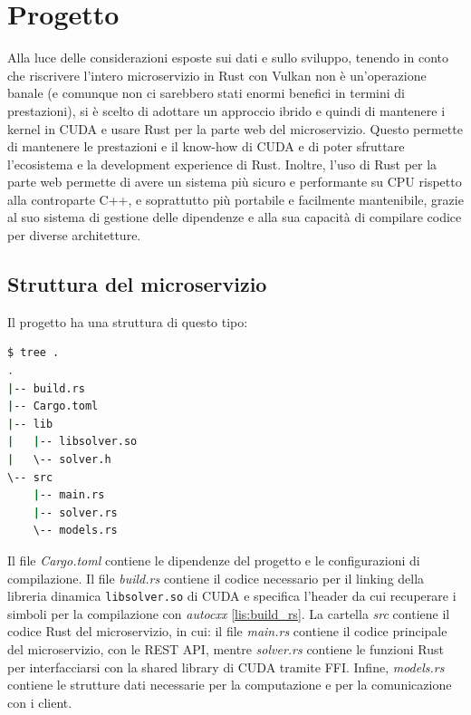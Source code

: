 \chapter{Progetto}
\label{sec:arch}

Alla luce delle considerazioni esposte sui dati e sullo sviluppo, tenendo in conto che riscrivere l'intero microservizio in Rust con Vulkan non è un'operazione banale (e comunque non ci sarebbero stati enormi benefici in termini di prestazioni), si è scelto di adottare un approccio ibrido e quindi di mantenere i kernel in CUDA e usare Rust per la parte web del microservizio. Questo permette di mantenere le prestazioni e il know-how di CUDA e di poter sfruttare l'ecosistema e la development experience di Rust. Inoltre, l'uso di Rust per la parte web permette di avere un sistema più sicuro e performante su CPU rispetto alla controparte C++, e soprattutto più portabile e facilmente mantenibile, grazie al suo sistema di gestione delle dipendenze e alla sua capacità di compilare codice per diverse architetture.


\section{Struttura del microservizio}


Il progetto ha una struttura di questo tipo:

\vspace{5mm}
\begin{lstlisting}[language=bash, caption=Directory del progetto, label=lis:tree]
$ tree .
.
|-- build.rs
|-- Cargo.toml
|-- lib
|   |-- libsolver.so
|   \-- solver.h
\-- src
    |-- main.rs
    |-- solver.rs
    \-- models.rs
\end{lstlisting}
\vspace{5mm}

Il file \textit{Cargo.toml} contiene le dipendenze del progetto e le configurazioni di compilazione. Il file \textit{build.rs} contiene il codice necessario per il linking della libreria dinamica \verb|libsolver.so| di CUDA e specifica l'header da cui recuperare i simboli per la compilazione con \textit{autocxx} \ref{lis:build_rs}. La cartella \textit{src} contiene il codice Rust del microservizio, in cui: il file \textit{main.rs} contiene il codice principale del microservizio, con le REST API, mentre \textit{solver.rs} contiene le funzioni Rust per interfacciarsi con la shared library di CUDA tramite FFI. Infine, \textit{models.rs} contiene le strutture dati necessarie per la computazione e per la comunicazione con i client.

